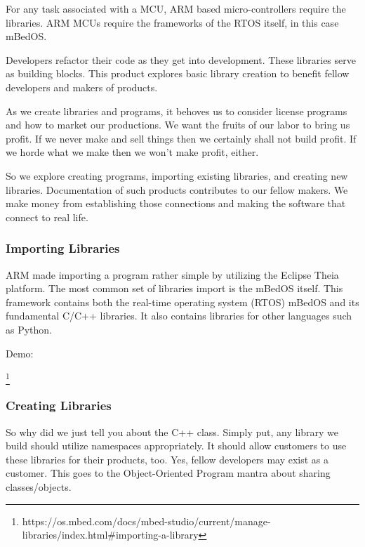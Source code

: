 \documentclass{article}
\begin{document}
For any task associated with a MCU, ARM based micro-controllers require the libraries. ARM MCUs require the frameworks of the RTOS itself, in this case mBedOS. 

Developers refactor their code as they get into development. These libraries serve as building blocks. This product explores basic library creation to benefit fellow developers and makers of products. 

As we create libraries and programs, it behoves us to consider license programs and how to market our productions. We want the fruits of our labor to bring us profit. If we never make and sell things then we certainly shall not build profit.  If we horde what we make then we won't make profit, either.

So we explore creating programs, importing existing libraries, and creating new libraries. Documentation of such products contributes to our fellow makers.  We make money from establishing those connections and making the software that connect to real life. 




\subsubsection{Importing Libraries} %
\label{ssub:importing_libraries}
ARM made importing a program rather simple by utilizing the Eclipse Theia platform.  The most common set of libraries import is the mBedOS itself.  This framework contains both the real-time operating system (RTOS) mBedOS and its fundamental C/C++ libraries.  It also contains libraries for other languages such as Python.

Demo:

\footnote{https://os.mbed.com/docs/mbed-studio/current/manage-libraries/index.html#importing-a-library}


\subsubsection{Creating Libraries} %
\label{ssub:creating_libraries}


So why did we just tell you about the C++ class.  Simply put, any library we build should utilize namespaces appropriately.  It should allow customers to use these libraries for their products, too.  Yes, fellow developers may exist as a customer.  This goes to the Object-Oriented Program mantra about sharing classes/objects.  
\end{document}
